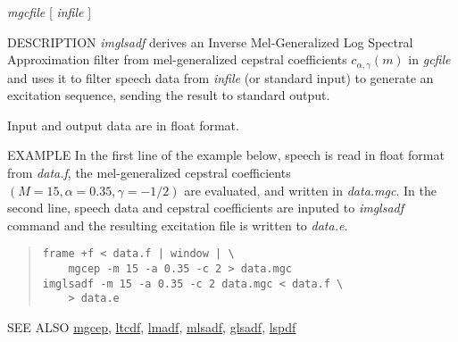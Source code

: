 \begin{synopsis}
\item [imglsadf] [ --m $M$ ] [ --a $A$ ] [ --c $C$ ] [ --p $P$ ]
                 [ --i $I$ ]  [ --t ]  [ --k ]
\item [\ ~~~~~~~~~] {\em mgcfile} [ {\em infile} ]
\end{synopsis}

\begin{qsection}{DESCRIPTION}
{\em imglsadf} derives an Inverse Mel-Generalized 
Log Spectral Approximation filter from 
mel-generalized cepstral coefficients $c_{\alpha,\gamma}(m)$ in {\em gcfile} 
and uses it to filter speech data from {\em infile} (or standard input) 
to generate an excitation sequence,
sending the result to standard output.

Input and output data are in float format.
\end{qsection}

\begin{options} 
\end{options}

\begin{qsection}{EXAMPLE}
In the first line of the example below, 
speech is read in float format from {\em data.f},
the mel-generalized cepstral coefficients $(M=15,\alpha=0.35,\gamma=-1/2)$
are evaluated, and written in {\em data.mgc}.
In the second line,
speech data and cepstral coefficients are
inputed to {\em imglsadf} command and the resulting excitation file
is written to {\em data.e}.
\begin{quote}
 \verb!frame +f < data.f | window | \!\\
 \verb!    mgcep -m 15 -a 0.35 -c 2 > data.mgc!\\
 \verb!imglsadf -m 15 -a 0.35 -c 2 data.mgc < data.f \!\\
 \verb!    > data.e!
\end{quote} 
\end{qsection}

\begin{qsection}{SEE ALSO}
\hyperlink{mgcep}{mgcep},
\hyperlink{ltcdf}{ltcdf},
\hyperlink{lmadf}{lmadf},
\hyperlink{mlsadf}{mlsadf},
\hyperlink{glsadf}{glsadf},
\hyperlink{lspdf}{lspdf}
\end{qsection}
